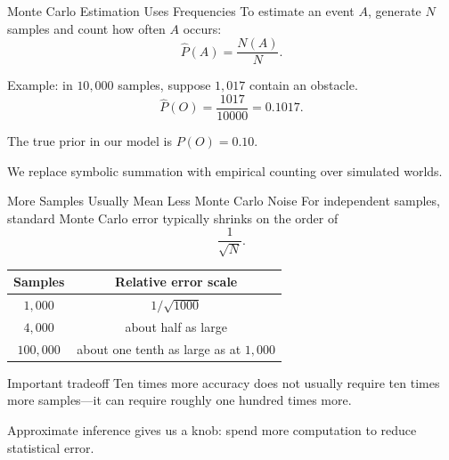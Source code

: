 \documentclass[aspectratio=169,10pt]{beamer}
\begin{document}
\begin{frame}[shrink=10]{Monte Carlo Estimation Uses Frequencies}
  To estimate an event $A$, generate $N$ samples and count how often $A$ occurs:
  \[
    \widehat{P}(A)=\frac{N(A)}{N}.
  \]

  Example: in $10{,}000$ samples, suppose $1{,}017$ contain an obstacle.
  \[
    \widehat{P}(O)=\frac{1017}{10000}=0.1017.
  \]

  The true prior in our model is $P(O)=0.10$.

  \begin{keyidea}
    We replace symbolic summation with empirical counting over simulated worlds.
  \end{keyidea}
\end{frame}

\begin{frame}[shrink=10]{More Samples Usually Mean Less Monte Carlo Noise}
  For independent samples, standard Monte Carlo error typically shrinks on the order of
  \[
    \frac{1}{\sqrt{N}}.
  \]

  \begin{center}
  \renewcommand{\arraystretch}{1.3}
  \begin{tabular}{c|c}
    \textbf{Samples} & \textbf{Relative error scale} \\\hline
    $1{,}000$ & $1/\sqrt{1000}$ \\
    $4{,}000$ & about half as large \\
    $100{,}000$ & about one tenth as large as at $1{,}000$
  \end{tabular}
  \end{center}

  \begin{block}{Important tradeoff}
    Ten times more accuracy does not usually require ten times more samples---it can require roughly one hundred times more.
  \end{block}

  \begin{keyidea}
    Approximate inference gives us a knob: spend more computation to reduce statistical error.
  \end{keyidea}
\end{frame}
\end{document}
